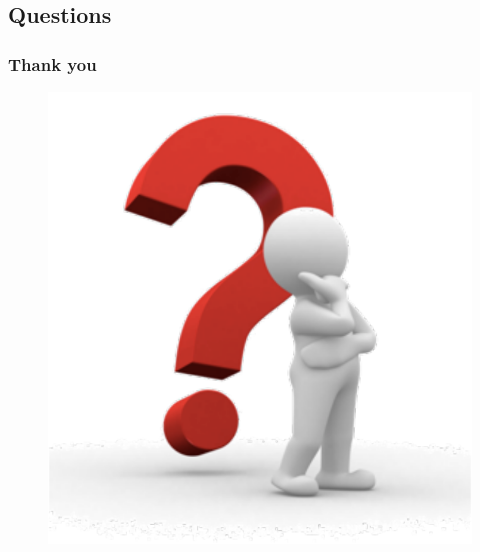 \documentclass{beamer}
\begin{document}
\subsection{Questions}
\begin{frame}\frametitle{Thank you}
\begin{figure}
\includegraphics[scale =0.55] {images/Question} 
\end{figure}
\end{frame}
\end{document}
